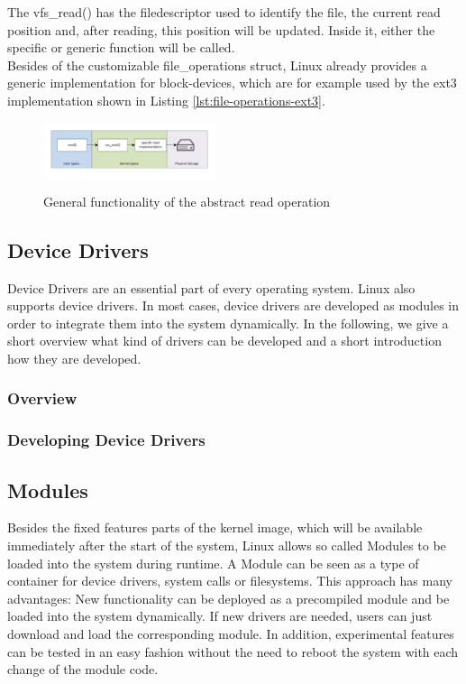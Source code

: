 \documentclass{sig-alternate-05-2015}
\begin{document}
 The vfs\_read() has the filedescriptor used to identify the file, the current read position and, after reading, this position will be updated. Inside it, either the specific or generic function will be called.\\
Besides of the customizable file\_operations struct, Linux already provides a generic implementation for block-devices, which are for example used by the ext3 implementation shown in Listing \ref{lst:file-operations-ext3}. 


\begin{figure}
\centering
\includegraphics[width= 0.45\textwidth ]{img/vfs-read-abstraction.pdf}
\label{fig:vfs-read-abstraction}
\caption{General functionality of the abstract read operation}
\end{figure}

\subsection{Device Drivers}
Device Drivers are an essential part of every operating system. Linux also supports device drivers. In most cases, device drivers are developed as modules in order to integrate them into the system dynamically. In the following, we give a short overview what kind of drivers can be developed and a short introduction how they are developed. 
\subsubsection{Overview}
\subsubsection{Developing Device Drivers}

\subsection{Modules}
\label{chap:mods}
Besides the fixed features parts of the kernel image, which will be available immediately after the start of the system, Linux allows so called Modules to be loaded into the system during runtime. A Module can be seen as a type of container for device drivers, system calls or filesystems.
This approach has many advantages: New functionality can be deployed as a precompiled module and be loaded into the system dynamically. If new drivers are needed, users can just download and load the corresponding module. In addition, experimental features can be tested in an easy fashion without the need to reboot the system with each change of the module code.
\end{document}
